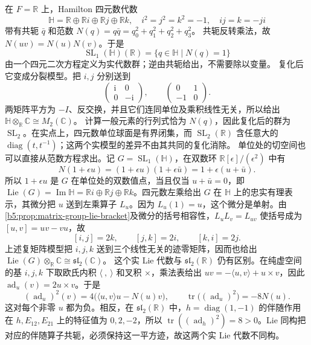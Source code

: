 在 \(F=\mathbb R\) 上，Hamilton 四元数代数
\[
	\mathbb H=\mathbb R\oplus\mathbb Ri\oplus\mathbb Rj\oplus\mathbb Rk, \quad i^2=j^2=k^2=-1,\quad ij=k=-ji
\]
带有共轭 \(\bar q\) 和范数 \(N(q)=q\bar q=q_0^2+q_1^2+q_2^2+q_3^2\)。 共轭反转乘法，故 \(N(uv)=N(u)N(v)\)。于是
\[
	\operatorname{SL}_1(\mathbb H)(\mathbb R)=\bigl\{q\in\mathbb H\mid N(q)=1\bigr\}
\]
由一个四元二次方程定义为实代数群；逆由共轭给出，不需要除以变量。
\ProseParagraphBreak
复化后它变成分裂模型。把 \(i,j\) 分别送到
\[
	\begin{pmatrix}\mathrm i&0\\0&-\mathrm i\end{pmatrix},
	\qquad
	\begin{pmatrix}0&1\\-1&0\end{pmatrix}.
\]
两矩阵平方为 \(-I\)、反交换，并且它们连同单位及乘积线性无关，所以给出 \(\mathbb H\otimes_{\mathbb R}\mathbb C\cong M_2(\mathbb C)\)。 计算一般元素的行列式恰为 \(N(q)\)，因此复化后的群为 \(\operatorname{SL}_2\)。在实点上，四元数单位球面是有界闭集，而 \(\operatorname{SL}_2(\mathbb R)\) 含任意大的 \(\operatorname{diag}(t,t^{-1})\)；这两个实模型的差异不由其共同的复化消除。
\ProseParagraphBreak
单位处的切空间也可以直接从范数方程求出。记 \(G=\operatorname{SL}_1(\mathbb H)\)，在双数环 \(\mathbb R[\epsilon]/(\epsilon^2)\) 中有
\[
	N(1+\epsilon u) =(1+\epsilon u)(1+\epsilon\bar u) =1+\epsilon(u+\bar u).
\]
所以 \(1+\epsilon u\) 是 \(G\) 在单位处的双数值点，当且仅当 \(u+\bar u=0\)，即 \(\operatorname{Lie}(G)=\operatorname{Im}\mathbb H=\mathbb Ri\oplus\mathbb Rj\oplus\mathbb Rk\)。四元数左乘给出 \(G\) 在 \(\mathbb H\) 上的忠实有理表示，其微分把 \(u\) 送到左乘算子 \(L_u\)。因为 \(L_u(1)=u\)，这个微分是单射。由\cref{b5:prop:matrix-group-lie-bracket}及微分的括号相容性，\(L_uL_v=L_{uv}\) 使括号成为 \([u,v]=uv-vu\)，故
\[
	[i,j]=2k,\qquad [j,k]=2i,\qquad [k,i]=2j.
\]
上述复矩阵模型把 \(i,j,k\) 送到三个线性无关的迹零矩阵，因而也给出 \(\operatorname{Lie}(G)\otimes_{\mathbb R}\mathbb C\cong\mathfrak{sl}_2(\mathbb C)\)。
\ProseParagraphBreak
这个实 Lie 代数与 \(\mathfrak{sl}_2(\mathbb R)\) 仍有区别。在纯虚空间的基 \(i,j,k\) 下取欧氏内积 \(\langle\ ,\ \rangle\) 和叉积 \(\times\)，乘法表给出 \(uv=-\langle u,v\rangle+u\times v\)，因此 \(\operatorname{ad}_u(v)=2u\times v\)。于是
\[
	(\operatorname{ad}_u)^2(v) =4\bigl(\langle u,v\rangle u-N(u)v\bigr),\qquad \operatorname{tr}\bigl((\operatorname{ad}_u)^2\bigr)=-8N(u).
\]
这对每个非零 \(u\) 都为负。相反，在 \(\mathfrak{sl}_2(\mathbb R)\) 中，\(h=\operatorname{diag}(1,-1)\) 的伴随作用在 \(h,E_{12},E_{21}\) 上的特征值为 \(0,2,-2\)，所以 \(\operatorname{tr}((\operatorname{ad}_h)^2)=8>0\)。Lie 同构把对应的伴随算子共轭，必须保持这一平方迹，故这两个实 Lie 代数不同构。
